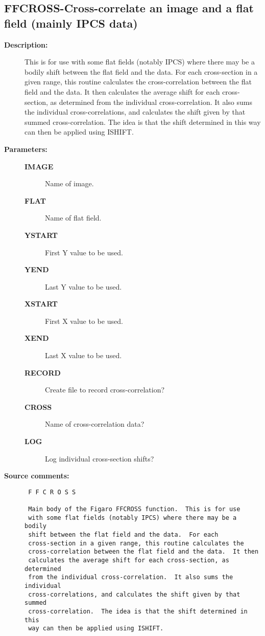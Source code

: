 \subsection{FFCROSS-\label{FFCROSS}Cross-correlate an image and a flat field (mainly IPCS data)}
\begin{description}

\item [{\bf Description:}]
 This is for use with some flat fields (notably IPCS) where
 there may be a bodily shift between the flat field and the data.
 For each cross-section in a given range, this routine calculates
 the cross-correlation between the flat field and the data. It then
 calculates the average shift for each cross-section, as determined
 from the individual cross-correlation.  It also sums the individual
 cross-correlations, and calculates the shift given by that summed
 cross-correlation.  The idea is that the shift determined in this
 way can then be applied using ISHIFT.

\item [{\bf Parameters:}]
\begin{description}
\item [{\bf IMAGE}]
 Name of image.
\item [{\bf FLAT}]
 Name of flat field.
\item [{\bf YSTART}]
 First Y value to be used.
\item [{\bf YEND}]
 Last Y value to be used.
\item [{\bf XSTART}]
 First X value to be used.
\item [{\bf XEND}]
 Last X value to be used.
\item [{\bf RECORD}]
 Create file to record cross-correlation?
\item [{\bf CROSS}]
 Name of cross-correlation data?
\item [{\bf LOG}]
 Log individual cross-section shifts?
\end{description}

\item [{\bf Source comments:}]
\begin{verbatim}
 F F C R O S S

 Main body of the Figaro FFCROSS function.  This is for use
 with some flat fields (notably IPCS) where there may be a bodily
 shift between the flat field and the data.  For each
 cross-section in a given range, this routine calculates the
 cross-correlation between the flat field and the data.  It then
 calculates the average shift for each cross-section, as determined
 from the individual cross-correlation.  It also sums the individual
 cross-correlations, and calculates the shift given by that summed
 cross-correlation.  The idea is that the shift determined in this
 way can then be applied using ISHIFT.


\end{verbatim}
\end{description}
